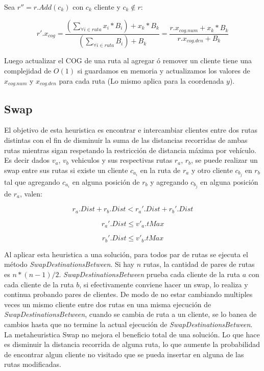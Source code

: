 \bigskip

Sea $r'' = r.Add(c_k)$ con $c_k$ cliente y $c_k \notin r$:

\begin{equation}
r'.x_{cog} =  \frac{(\sum_{\forall i \in ruta} x_i * B_i) + x_k * B_k}{(\sum_{\forall i \in ruta} B_i) + B_k}  = \frac{r.x_{cog.num}+x_k*B_k}{r.x_{cog.den}+B_k}
\end{equation}

\bigskip

Luego actualizar el COG de una ruta al agregar ó remover un cliente tiene una complejidad de $O(1)$ si guardamos en memoria y actualizamos los valores de $x_{cog.num}$ y $x_{cog.den}$ para cada ruta (Lo mismo aplica para la coordenada $y$).

\bigskip



\subsection{Swap}

El objetivo de esta heuristica es encontrar e intercambiar clientes entre dos rutas distintas con el fin de disminuir la suma de las distancias recorridas de ambas rutas mientras sigan respetando la restricción de distancia máxima por vehículo. Es decir dados $v_a$, $v_b$ vehiculos y sus respectivas rutas $r_a$, $r_b$, se puede realizar un swap entre sus rutas si existe un cliente $c_{a_i}$ en la ruta de $r_a$ y otro cliente $c_{b_j}$ en $r_b$ tal que agregando $c_{a_i}$ en alguna posición de $r_b$ y agregando $c_{b_j}$ en alguna posición de $r_a$, valen:

\begin{equation*}
r_a.Dist + r_b.Dist < r_a'.Dist + r_b'.Dist \nonumber
\end{equation*}

\begin{equation*}
r_a'.Dist \leq v'_a.tMax
\end{equation*}

\begin{equation*}
r_b'.Dist \leq v'_b.tMax
\end{equation*}

Al aplicar esta heuristica a una solución, para todos par de rutas se ejecuta el método \textit{SwapDestinationsBetween}. Si hay $n$ rutas, la cantidad de pares de rutas es $n * (n-1) / 2$. \textit{SwapDestinationsBetween} prueba cada cliente de la ruta $a$ con cada cliente de la ruta $b$, si efectivamente conviene hacer un swap, lo realiza y continua probando pares de clientes. De modo de no estar cambiando multiples veces un mismo cliente entre dos rutas en una misma ejecución de \textit{SwapDestinationsBetween}, cuando se cambia de ruta a un cliente, se lo banea de cambios hasta que no termine la actual ejecución de \textit{SwapDestinationsBetween}. La metaheuristica Swap no mejora el beneficio total de una solución. Lo que hace es disminuir la distancia recorrida de alguna ruta, lo que aumente la probabilidad de encontrar algun cliente no visitado que se pueda insertar en alguna de las rutas modificadas.

